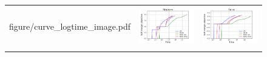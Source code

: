 \begin{figure}[p]
\begin{tabular}{ccc}
\begin{minipage}[t]{0.31\hsize}
            {figure/curve_logtime_image.pdf}
        \end{minipage}
        &
        \begin{minipage}[t]{0.31\hsize}
            \centering
            \includegraphics[keepaspectratio, scale=0.30]
            {figure/curve_logtime_ringnorm.pdf}
        \end{minipage}
        &
        \begin{minipage}[t]{0.31\hsize}
            \centering
            \includegraphics[keepaspectratio, scale=0.30]
            {figure/curve_logtime_splice.pdf}
        \end{minipage}
        \\
        \begin{minipage}[t]{0.31\hsize}
            \centering

\end{minipage}
\end{tabular}
\end{figure}
